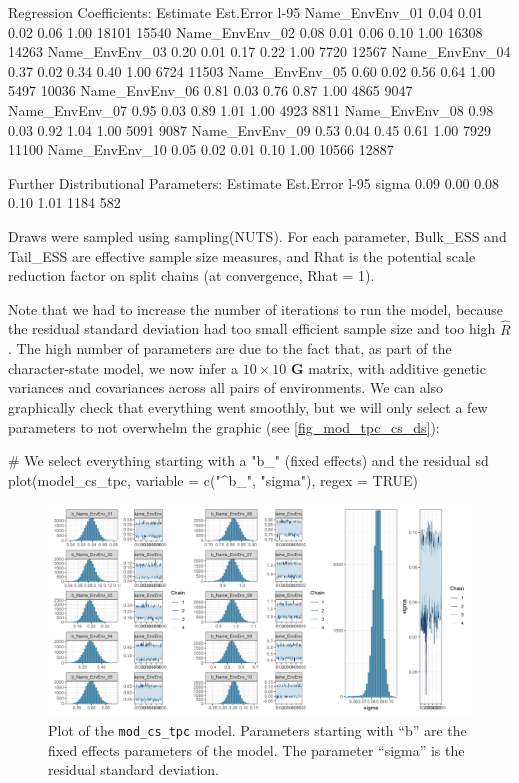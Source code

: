 \documentclass[a4paper,12pt,twoside]{article}
\begin{document}
\begin{Routput}
Regression Coefficients:
               Estimate Est.Error l-95%
Name_EnvEnv_01     0.04      0.01     0.02     0.06 1.00    18101    15540
Name_EnvEnv_02     0.08      0.01     0.06     0.10 1.00    16308    14263
Name_EnvEnv_03     0.20      0.01     0.17     0.22 1.00     7720    12567
Name_EnvEnv_04     0.37      0.02     0.34     0.40 1.00     6724    11503
Name_EnvEnv_05     0.60      0.02     0.56     0.64 1.00     5497    10036
Name_EnvEnv_06     0.81      0.03     0.76     0.87 1.00     4865     9047
Name_EnvEnv_07     0.95      0.03     0.89     1.01 1.00     4923     8811
Name_EnvEnv_08     0.98      0.03     0.92     1.04 1.00     5091     9087
Name_EnvEnv_09     0.53      0.04     0.45     0.61 1.00     7929    11100
Name_EnvEnv_10     0.05      0.02     0.01     0.10 1.00    10566    12887

Further Distributional Parameters:
      Estimate Est.Error l-95%
sigma     0.09      0.00     0.08     0.10 1.01     1184      582

Draws were sampled using sampling(NUTS). For each parameter, Bulk_ESS
and Tail_ESS are effective sample size measures, and Rhat is the potential
scale reduction factor on split chains (at convergence, Rhat = 1).
\end{Routput}
Note that we had to increase the number of iterations to run the model, because the residual standard deviation had too small efficient sample size and too high $\hat{R}$.
The high number of parameters are due to the fact that, as part of the character-state model, we now infer a $10\times10$ $\mathbf{G}$ matrix, with additive genetic variances and covariances across all pairs of environments.
We can also graphically check that everything went smoothly, but we will only select a few parameters to not overwhelm the graphic (see \autoref{fig_mod_tpc_cs_ds}):
\begin{Rinput}
# We select everything starting with a "b_" (fixed effects) and the residual sd
plot(model_cs_tpc, variable = c("^b_", "sigma"), regex = TRUE)
\end{Rinput}

\begin{figure}[t!h!]
  \includegraphics[width = \textwidth]{TPC_discrete_cs_model.png}
  \caption{Plot of the \texttt{mod\_cs\_tpc} model. Parameters starting with ``b'' are the fixed effects parameters of the model. The parameter ``sigma'' is the residual standard deviation.}
  \label{fig_mod_tpc_cs_ds}
\end{figure}
\end{document}
